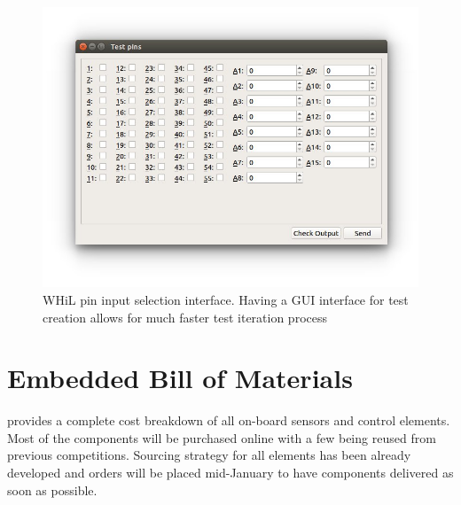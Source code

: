 \documentclass[main.tex]{subfiles}
\begin{document}
   \begin{figure}
        \centering
 		\includegraphics[width=\textwidth]{images/pin-testing.jpg}
		\caption{WHiL pin input selection interface. Having a GUI interface for test creation allows for much faster test iteration process}
        \label{fig:hil-pin-selection}
   \end{figure}
   
\section{Embedded Bill of Materials}
     provides a complete cost breakdown of all on-board sensors and control elements. Most of the components will be purchased online with a few being reused from previous competitions. Sourcing strategy for all elements has been already developed and orders will be placed mid-January to have components delivered as soon as possible.
    
\end{document}
